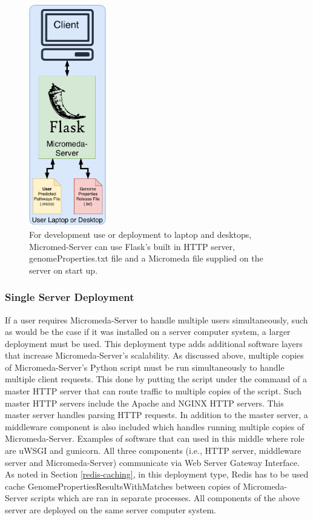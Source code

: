 \begin{figure}[!ht]
  \centering
	\includegraphics[width=0.30\textwidth]{media/micromeda-simple-deployment.pdf}
	 \caption{For development use or deployment to laptop and desktops, Micromed-Server can use Flask's built in HTTP server, genomeProperties.txt file and a Micromeda file supplied on the server on start up.}
	 \label{fig:micromeda-small-deploy}
\end{figure}

\subsubsection{Single Server Deployment}

If a user requires Micromeda-Server to handle multiple users simultaneously, such as would be the case if it was installed on a server computer system, a larger deployment must be used. This deployment type adds additional software layers that increase Micromeda-Server's scalability. As discussed above, multiple copies of Micromeda-Server's Python script must be run simultaneously to handle multiple client requests. This done by putting the script under the command of a master HTTP server that can route traffic to multiple copies of the script. Such master HTTP servers include the Apache and NGINX HTTP servers. This master server handles parsing HTTP requests. In addition to the master server, a middleware component is also included which handles running multiple copies of Micromeda-Server. Examples of software that can used in this middle where role are uWSGI and gunicorn. All three components (i.e., HTTP server, middleware server and Micromeda-Server) communicate via Web Server Gateway Interface. As noted in Section \ref{redis-caching}, in this deployment type, Redis has to be used cache GenomePropertiesResultsWithMatches between copies of Micromeda-Server scripts which are ran in separate processes. All components of the above server are deployed on the same server computer system.

